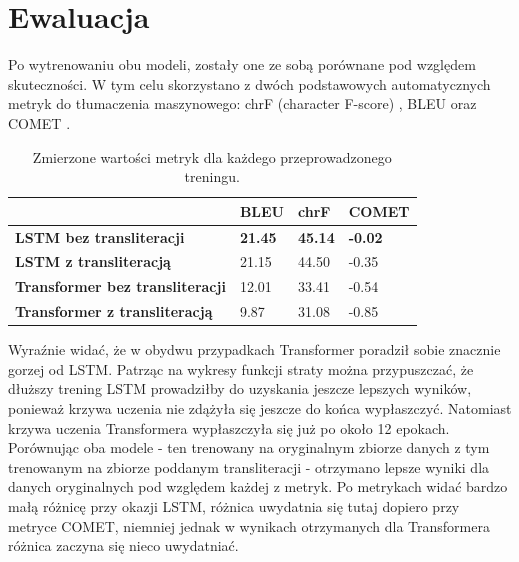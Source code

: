 \documentclass[
    left=2.5cm,         %
    right=2.5cm,        %
    top=2.5cm,          %
    bottom=3cm,         %
    bindingoffset=6mm,  %
    nohyphenation=false %
]{eiti/eiti-report}
\begin{document}
\section{Ewaluacja}
    
    Po wytrenowaniu obu modeli, zostały one ze sobą porównane pod względem skuteczności. W tym celu skorzystano z dwóch podstawowych automatycznych metryk do tłumaczenia maszynowego: chrF (character F-score) \cite{popovic-2015-chrf}, BLEU \cite{BLEU} oraz COMET \cite{COMET}.
    
\begin{table}[H]
\centering
\footnotesize
\begin{tabular}{ |p{5cm}||p{3cm}|p{3cm}|p{3cm}|  }
    \hline
    \footnotesize{} & \footnotesize{BLEU} & \footnotesize{chrF}&  \footnotesize{COMET} \\
    \hline
     \textbf{LSTM bez transliteracji} & \textbf{21.45}  &  \textbf{45.14}  & \textbf{-0.02} \\
     \hline
     \textbf{LSTM z transliteracją} & 21.15  &  44.50  & -0.35 \\
     \hline
     \textbf{Transformer bez transliteracji} & 12.01  &  33.41  & -0.54 \\
     \hline
     \textbf{Transformer z transliteracją} & 9.87 & 31.08 & -0.85 \\
     \hline
\end{tabular}
\caption{Zmierzone wartości metryk dla każdego przeprowadzonego treningu.}
\label{tab:attr_table}
\end{table}

Wyraźnie widać, że w obydwu przypadkach Transformer poradził sobie znacznie gorzej od LSTM. Patrząc na wykresy funkcji straty można przypuszczać, że dłuższy trening LSTM prowadziłby do uzyskania jeszcze lepszych wyników, ponieważ krzywa uczenia nie zdążyła się jeszcze do końca wypłaszczyć. Natomiast krzywa uczenia Transformera wypłaszczyła się już po około 12 epokach.\\

Porównując oba modele - ten trenowany na oryginalnym zbiorze danych z tym trenowanym na zbiorze poddanym transliteracji - otrzymano lepsze wyniki dla danych oryginalnych pod względem każdej z metryk. Po metrykach widać bardzo małą różnicę przy okazji LSTM, różnica uwydatnia się tutaj dopiero przy metryce COMET, niemniej jednak w wynikach otrzymanych dla Transformera różnica zaczyna się nieco uwydatniać.\\
\end{document}
